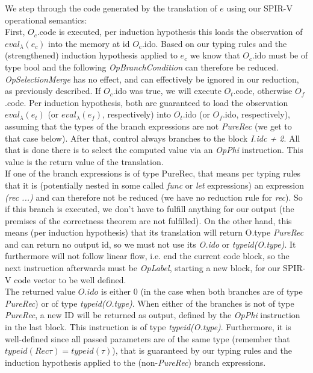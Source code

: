 \documentclass[letterpaper,12pt]{article}
\begin{document}
We step through the code generated by the translation of $e$ using
our SPIR-V operational semantics: \\
First, $O_c$.code is executed, per induction hypothesis
this loads the observation of $eval_\lambda(e_c)$ into the memory
at id $O_c$.ido. Based on our typing rules and the (strengthened) induction hypothesis
applied to $e_c$ we know that $O_c$.ido must be of type bool and the
following \textit{OpBranchCondition} can therefore be reduced.
\textit{OpSelectionMerge} has no effect, and can effectively be ignored
in our reduction, as previously described.
If $O_c$.ido was true, we will execute $O_t$.code, otherwise
$O_f$.code. Per induction hypothesis, both are guaranteed to load
the observation $eval_\lambda(e_t)$ (or $eval_\lambda(e_f)$, respectively)
into $O_t$.ido (or $O_f$.ido, respectively), assuming that the types of the
branch expressions are not \textit{PureRec} (we get to that case below).
After that, control always branches to the block \textit{I.idc + 2}.
All that is done there is to select the computed value via an \textit{OpPhi}
instruction. This value is the return value of the translation. \\

If one of the branch expressions is of type PureRec, that means per
typing rules that it is (potentially nested in some called \textit{func}
or \textit{let} expressions) an expression \textit{(rec ...)}
and can therefore not be reduced (we have no reduction rule for \textit{rec}).
So if this branch is executed, we don't have to fulfill anything
for our output (the premises of the correctness theorem are not fulfilled).
On the other hand, this means (per induction hypothesis)
that its translation will return O.type \textit{PureRec} and can return
no output id, so we must not use its \textit{O.ido} or \textit{typeid(O.type)}.
It furthermore will not follow linear flow, i.e. end the current code block,
so the next instruction afterwards must be \textit{OpLabel}, starting
a new block, for our SPIR-V code vector to be well defined. \\

The returned value $O.ido$ is either $0$ (in the case
when both branches are of type \textit{PureRec}) or of type \textit{typeid(O.type)}.
When either of the branches is not of type \textit{PureRec}, a new
ID will be returned as output, defined by the \textit{OpPhi} instruction
in the last block. This instruction is of type \textit{typeid(O.type)}.
Furthermore, it is well-defined since all passed parameters are
of the same type (remember that $typeid(Rec \tau) = typeid(\tau)$),
that is guaranteed by our typing rules and the induction hypothesis
applied to the (non-\textit{PureRec}) branch expressions.
\end{document}

